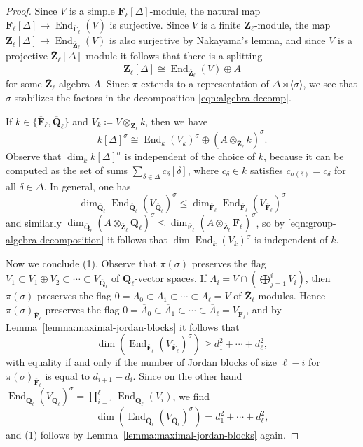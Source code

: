 \documentclass[reqno]{amsart}
\numberwithin{equation}{subsection}
\newcommand{\F}{\mathbf{F}}
\newcommand{\Q}{\mathbf{Q}}
\newcommand{\Z}{\mathbf{Z}}
\newcommand{\ol}[1]{\overline{#1}}
\DeclareMathOperator{\End}{End}
\theoremstyle{remark}
\numberwithin{equation}{subsection}
\numberwithin{figure}{subsection}
\begin{document}
\begin{proof}
    Since $\ol V$ is a simple $\ol\F_\ell[\Delta]$-module, the natural map $\ol\F_\ell[\Delta] \to \End_{\ol\F_\ell}(\ol V)$ is surjective. Since $V$ is a finite $\ol\Z_\ell$-module, the map $\ol\Z_\ell[\Delta] \to \End_{\ol\Z_\ell}(V)$ is also surjective by Nakayama's lemma, and since $V$ is a projective $\ol\Z_\ell[\Delta]$-module it follows that there is a splitting
    \begin{equation}\label{eqn:algebra-decomp}
    \ol\Z_\ell[\Delta] \cong \End_{\ol\Z_\ell}(V) \oplus A
    \end{equation}
    for some $\ol\Z_\ell$-algebra $A$. Since $\pi$ extends to a representation of $\Delta \rtimes \langle\sigma\rangle$, we see that $\sigma$ stabilizes the factors in the decomposition \eqref{eqn:algebra-decomp}.

    If $k \in \{\ol\F_\ell, \ol\Q_\ell\}$ and $V_k \coloneqq V \otimes_{\ol \Z_\ell}k$, then we have
    \begin{equation}\label{eqn:group-algebra-decomposition}
    k[\Delta]^\sigma \cong \End_k(V_k)^\sigma \oplus (A \otimes_{\ol\Z_\ell} k)^\sigma.
    \end{equation}
    Observe that $\dim_k k[\Delta]^\sigma$ is independent of the choice of $k$, because it can be computed as the set of sums $\sum_{\delta \in \Delta} c_\delta [\delta]$, where $c_\delta \in k$ satisfies $c_{\sigma(\delta)} = c_\delta$ for all $\delta \in \Delta$. In general, one has
    \[
    \dim_{\ol\Q_\ell} \End_{\ol\Q_\ell}(V_{\ol\Q_\ell})^\sigma \leq \dim_{\ol\F_\ell}\End_{\ol\F_\ell}(V_{\ol\F_\ell})^\sigma
    \]
    and similarly $\dim_{\ol\Q_\ell}(A \otimes_{\ol\Z_\ell} \ol\Q_\ell)^\sigma \leq \dim_{\ol\F_\ell}(A \otimes_{\ol\Z_\ell} \ol\F_\ell)^\sigma$, so by \eqref{eqn:group-algebra-decomposition} it follows that $\dim \End_k(V_k)^\sigma$ is independent of $k$.
    
    Now we conclude (1). Observe that $\pi(\sigma)$ preserves the flag $V_1 \subset V_1 \oplus V_2 \subset \cdots \subset V_{\ol\Q_\ell}$ of $\ol\Q_\ell$-vector spaces. If $\Lambda_i = V \cap (\bigoplus_{j=1}^i V_i)$, then $\pi(\sigma)$ preserves the flag $0 = \Lambda_0 \subset \Lambda_1 \subset \cdots \subset \Lambda_\ell = V$ of $\ol\Z_\ell$-modules. Hence $\pi(\sigma)_{\ol\F_\ell}$ preserves the flag $0 = \ol\Lambda_0 \subset \ol\Lambda_1 \subset \cdots \subset \ol\Lambda_\ell = V_{\ol\F_\ell}$, and by Lemma~\ref{lemma:maximal-jordan-blocks} it follows that
    \[
    \dim (\End_{\ol\F_\ell}(V_{\ol\F_\ell})^\sigma) \geq d_1^2 + \cdots + d_\ell^2,
    \]
    with equality if and only if the number of Jordan blocks of size $\ell - i$ for $\pi(\sigma)_{\ol\F_\ell}$ is equal to $d_{i+1} - d_i$. Since on the other hand $\End_{\ol\Q_\ell}(V_{\ol\Q_\ell})^\sigma = \prod_{i=1}^\ell \End_{\ol\Q_\ell}(V_i)$, we find
    \[
    \dim (\End_{\ol\Q_\ell}(V_{\ol\Q_\ell})^\sigma) = d_1^2 + \cdots + d_\ell^2,
    \]
    and (1) follows by Lemma~\ref{lemma:maximal-jordan-blocks} again.


\end{proof}
\end{document}
